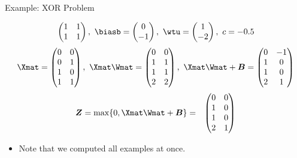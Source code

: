 \begin{vbframe}{Example: XOR Problem}
{\begin{eqnarray*}
\begin{pmatrix}
      1 & 1 \\
      1 & 1
    \end{pmatrix}, \
      \biasb = \begin{pmatrix}
      0 \\
      -1
    \end{pmatrix}, \
      \wtu = \begin{pmatrix}
      1 \\
      -2
    \end{pmatrix}, \
      c = - 0.5
  \end{eqnarray*}
  \begin{eqnarray*}
  \Xmat = \begin{pmatrix}
      0 & 0 \\
      0 & 1 \\
      1 & 0 \\
      1 & 1
    \end{pmatrix}, \
    \Xmat\Wmat = \begin{pmatrix}
      0 & 0 \\
      1 & 1 \\
      1 & 1 \\
      2 & 2
    \end{pmatrix}, \
      \Xmat \Wmat + \bm{B} = \begin{pmatrix}
        0 & -1 \\
        1 & 0 \\
        1 & 0 \\
        2 & 1
    \end{pmatrix}
  \end{eqnarray*}
  \begin{eqnarray*}
    \bm{Z} = \max\{0, \Xmat \Wmat+\bm{B}\}
    &=&
    \begin{pmatrix}
      0 & 0 \\
      1 & 0 \\
      1 & 0 \\
      2 & 1
    \end{pmatrix}
  \end{eqnarray*}
  \begin{itemize}
    \item Note that we computed all examples at once.
  \end{itemize}

}
\end{vbframe}
